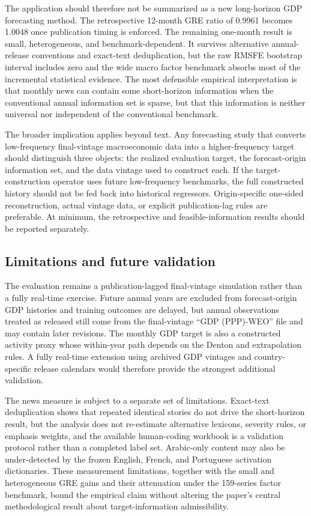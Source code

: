 \documentclass[preprint,12pt,authoryear]{elsarticle}
\begin{document}
The application should therefore not be summarized as a new long-horizon GDP forecasting method. The retrospective 12-month GRE ratio of 0.9961 becomes 1.0048 once publication timing is enforced. The remaining one-month result is small, heterogeneous, and benchmark-dependent. It survives alternative annual-release conventions and exact-text deduplication, but the raw RMSFE bootstrap interval includes zero and the wide macro factor benchmark absorbs most of the incremental statistical evidence. The most defensible empirical interpretation is that monthly news can contain some short-horizon information when the conventional annual information set is sparse, but that this information is neither universal nor independent of the conventional benchmark.

The broader implication applies beyond text. Any forecasting study that converts low-frequency final-vintage macroeconomic data into a higher-frequency target should distinguish three objects: the realized evaluation target, the forecast-origin information set, and the data vintage used to construct each. If the target-construction operator uses future low-frequency benchmarks, the full constructed history should not be fed back into historical regressors. Origin-specific one-sided reconstruction, actual vintage data, or explicit publication-lag rules are preferable. At minimum, the retrospective and feasible-information results should be reported separately.

\subsection{Limitations and future validation}
The evaluation remains a publication-lagged final-vintage simulation rather than a fully real-time exercise. Future annual years are excluded from forecast-origin GDP histories and training outcomes are delayed, but annual observations treated as released still come from the final-vintage ``GDP (PPP)-WEO'' file and may contain later revisions. The monthly GDP target is also a constructed activity proxy whose within-year path depends on the Denton and extrapolation rules. A fully real-time extension using archived GDP vintages and country-specific release calendars would therefore provide the strongest additional validation.

The news measure is subject to a separate set of limitations. Exact-text deduplication shows that repeated identical stories do not drive the short-horizon result, but the analysis does not re-estimate alternative lexicons, severity rules, or emphasis weights, and the available human-coding workbook is a validation protocol rather than a completed label set. Arabic-only content may also be under-detected by the frozen English, French, and Portuguese activation dictionaries. These measurement limitations, together with the small and heterogeneous GRE gains and their attenuation under the 159-series factor benchmark, bound the empirical claim without altering the paper's central methodological result about target-information admissibility.
\end{document}
